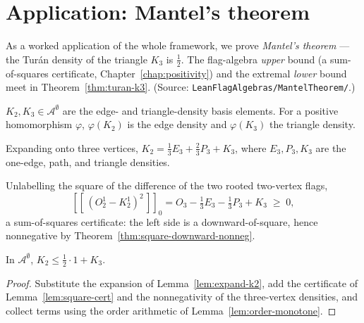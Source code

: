 \chapter{Application: Mantel's theorem}
\label{chap:mantel}

As a worked application of the whole framework, we prove \emph{Mantel's theorem}
--- the Tur\'an density of the triangle $K_3$ is $\tfrac12$. The flag-algebra
\emph{upper} bound (a sum-of-squares certificate, Chapter~\ref{chap:positivity})
and the extremal \emph{lower} bound meet in Theorem~\ref{thm:turan-k3}. (Source:
\texttt{LeanFlagAlgebras/MantelTheorem/}.)

\begin{definition}
  \label{def:densities}
  \leanok
  $K_2, K_3 \in \mathcal{A}^\emptyset$ are the edge- and triangle-density basis
  elements. For a positive homomorphism $\varphi$, $\varphi(K_2)$ is the edge
  density and $\varphi(K_3)$ the triangle density.
\end{definition}

\begin{lemma}
  \label{lem:expand-k2}
  \leanok
  Expanding onto three vertices,
  $K_2 = \tfrac13 E_3 + \tfrac23 P_3 + K_3$, where $E_3, P_3, K_3$ are the
  one-edge, path, and triangle densities.
\end{lemma}

\begin{lemma}
  \label{lem:square-cert}
  \leanok
  Unlabelling the square of the difference of the two rooted two-vertex flags,
  \[ [\![\,(O_2^{1} - K_2^{1})^2\,]\!]_0
      = O_3 - \tfrac13 E_3 - \tfrac13 P_3 + K_3 \;\ge\; 0, \]
  a sum-of-squares certificate: the left side is a downward-of-square, hence
  nonnegative by Theorem~\ref{thm:square-downward-nonneg}.
\end{lemma}

\begin{theorem}
  \label{thm:mantel-flag}
  \leanok
  In $\mathcal{A}^\emptyset$, $K_2 \le \tfrac12\cdot 1 + K_3$.
\end{theorem}
\begin{proof}
  \leanok
  Substitute the expansion of Lemma~\ref{lem:expand-k2}, add the certificate of
  Lemma~\ref{lem:square-cert} and the nonnegativity of the three-vertex
  densities, and collect terms using the order arithmetic of
  Lemma~\ref{lem:order-monotone}.
\end{proof}

